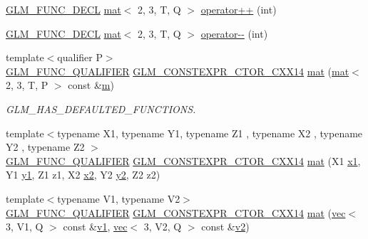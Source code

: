\begin{DoxyCompactItemize}
\hyperlink{setup_8hpp_ab2d052de21a70539923e9bcbf6e83a51}{G\+L\+M\+\_\+\+F\+U\+N\+C\+\_\+\+D\+E\+CL} \hyperlink{structglm_1_1mat}{mat}$<$ 2, 3, T, Q $>$ \hyperlink{structglm_1_1mat_3_012_00_013_00_01_t_00_01_q_01_4_aebb78fc2bc121d63a668f692874eacdf}{operator++} (int)
\item 
\hyperlink{setup_8hpp_ab2d052de21a70539923e9bcbf6e83a51}{G\+L\+M\+\_\+\+F\+U\+N\+C\+\_\+\+D\+E\+CL} \hyperlink{structglm_1_1mat}{mat}$<$ 2, 3, T, Q $>$ \hyperlink{structglm_1_1mat_3_012_00_013_00_01_t_00_01_q_01_4_ad500baad9a2da00e3f22e9776b9a3883}{operator-\/-\/} (int)
\item 
{\footnotesize template$<$qualifier P$>$ }\\\hyperlink{setup_8hpp_a33fdea6f91c5f834105f7415e2a64407}{G\+L\+M\+\_\+\+F\+U\+N\+C\+\_\+\+Q\+U\+A\+L\+I\+F\+I\+ER} \hyperlink{setup_8hpp_a0900f9145e68bf6061b6f5e7be3fa751}{G\+L\+M\+\_\+\+C\+O\+N\+S\+T\+E\+X\+P\+R\+\_\+\+C\+T\+O\+R\+\_\+\+C\+X\+X14} \hyperlink{structglm_1_1mat_3_012_00_013_00_01_t_00_01_q_01_4_a54292d5f34dca47737a3037100d133cb}{mat} (\hyperlink{structglm_1_1mat}{mat}$<$ 2, 3, T, P $>$ const \&\hyperlink{_s_d_l__opengl__glext_8h_af593500c283bf1a787a6f947f503a5c2}{m})
\begin{DoxyCompactList}\small\item\em G\+L\+M\+\_\+\+H\+A\+S\+\_\+\+D\+E\+F\+A\+U\+L\+T\+E\+D\+\_\+\+F\+U\+N\+C\+T\+I\+O\+NS. \end{DoxyCompactList}\item 
{\footnotesize template$<$typename X1, typename Y1, typename Z1 , typename X2 , typename Y2 , typename Z2 $>$ }\\\hyperlink{setup_8hpp_a33fdea6f91c5f834105f7415e2a64407}{G\+L\+M\+\_\+\+F\+U\+N\+C\+\_\+\+Q\+U\+A\+L\+I\+F\+I\+ER} \hyperlink{setup_8hpp_a0900f9145e68bf6061b6f5e7be3fa751}{G\+L\+M\+\_\+\+C\+O\+N\+S\+T\+E\+X\+P\+R\+\_\+\+C\+T\+O\+R\+\_\+\+C\+X\+X14} \hyperlink{structglm_1_1mat_3_012_00_013_00_01_t_00_01_q_01_4_a12429e3e8f84a37878a67490604c7173}{mat} (X1 \hyperlink{_s_d_l__opengl__glext_8h_a49825216c96caaeb09237b36651181c5}{x1}, Y1 \hyperlink{_s_d_l__opengl__glext_8h_a3af6c78fcdfccea028a5878bc747ef39}{y1}, Z1 z1, X2 \hyperlink{_s_d_l__opengl__glext_8h_a7b907a03236685c534d89d604cff23c8}{x2}, Y2 \hyperlink{_s_d_l__opengl__glext_8h_a2be1135ed68e8d80fa9e130c7814f8c2}{y2}, Z2 z2)
\item 
{\footnotesize template$<$typename V1, typename V2$>$ }\\\hyperlink{setup_8hpp_a33fdea6f91c5f834105f7415e2a64407}{G\+L\+M\+\_\+\+F\+U\+N\+C\+\_\+\+Q\+U\+A\+L\+I\+F\+I\+ER} \hyperlink{setup_8hpp_a0900f9145e68bf6061b6f5e7be3fa751}{G\+L\+M\+\_\+\+C\+O\+N\+S\+T\+E\+X\+P\+R\+\_\+\+C\+T\+O\+R\+\_\+\+C\+X\+X14} \hyperlink{structglm_1_1mat_3_012_00_013_00_01_t_00_01_q_01_4_a3e0d4479b6a5787d1d6116514c10cb0b}{mat} (\hyperlink{structglm_1_1vec}{vec}$<$ 3, V1, Q $>$ const \&\hyperlink{_s_d_l__opengl__glext_8h_a435c176a02c061b43e19bdf7c86cceae}{v1}, \hyperlink{structglm_1_1vec}{vec}$<$ 3, V2, Q $>$ const \&\hyperlink{_s_d_l__opengl__glext_8h_a0928f6d0f0f794ba000a21dfae422136}{v2})

\end{DoxyCompactItemize}
